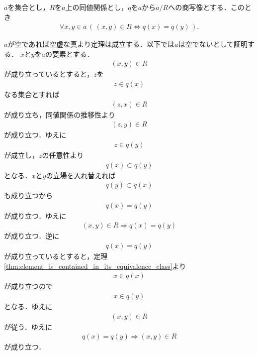 	\begin{screen}
		\begin{thm}[同値な要素同士の同値類は一致する]\label{thm:equivalence_classes_of_equivalent_elements_coincide}
			$a$を集合とし，$R$を$a$上の同値関係とし，$q$を$a$から$a/R$への商写像とする．このとき
			\begin{align}
				\forall x,y \in a\, \left(\, (x,y) \in R \Longleftrightarrow q(x) = q(y)\, \right).
			\end{align}
		\end{thm}
	\end{screen}
	
	\begin{sketch}
		$a$が空であれば空虚な真より定理は成立する．以下では$a$は空でないとして証明する．
		$x$と$y$を$a$の要素とする．
		\begin{align}
			(x,y) \in R
		\end{align}
		が成り立っているとすると，$z$を
		\begin{align}
			z \in q(x)
		\end{align}
		なる集合とすれば
		\begin{align}
			(z,x) \in R
		\end{align}
		が成り立ち，同値関係の推移性より
		\begin{align}
			(z,y) \in R
		\end{align}
		が成り立つ．ゆえに
		\begin{align}
			z \in q(y)
		\end{align}
		が成立し，$z$の任意性より
		\begin{align}
			q(x) \subset q(y)
		\end{align}
		となる．$x$と$y$の立場を入れ替えれば
		\begin{align}
			q(y) \subset q(x)
		\end{align}
		も成り立つから
		\begin{align}
			q(x) = q(y)
		\end{align}
		が成り立つ．ゆえに
		\begin{align}
			(x,y) \in R \Longrightarrow q(x) = q(y)
		\end{align}
		が成り立つ．逆に
		\begin{align}
			q(x) = q(y)
		\end{align}
		が成り立っているとすると，定理\ref{thm:element_is_contained_in_its_equivalence_class}より
		\begin{align}
			x \in q(x)
		\end{align}
		が成り立つので
		\begin{align}
			x \in q(y)
		\end{align}
		となる．ゆえに
		\begin{align}
			(x,y) \in R
 		\end{align}
 		が従う．ゆえに
 		\begin{align}
			q(x) = q(y) \Longrightarrow (x,y) \in R
		\end{align}
		が成り立つ．
		\QED
	\end{sketch}
	

